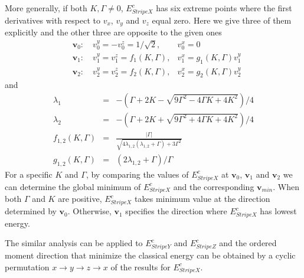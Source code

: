 \documentclass[aps,prb,reprint,amsfonts,amsmath,amssymb,showpacs,groupedaddress,superscriptaddress]{revtex4-1}
\begin{document}
More generally, if both $K, \Gamma \neq 0$, $E_{StripeX}^{c}$ has six extreme points where the first derivatives with respect to $v_x$, $v_y$ and $v_z$ equal zero. Here we give three of them explicitly and the other three are opposite to the given ones
\begin{subequations}
    \begin{eqnarray}
        & \bm{v}_0: \quad v_{0}^{y}=-v_{0}^{z} = 1/\sqrt{2}, & v_{0}^{x} = 0 \\
        & \bm{v}_1: \quad v_{1}^{y}=v_{1}^{z} = f_{1}(K, \Gamma), & v_{1}^{x} = g_{1}(K, \Gamma) v_{1}^{y} \\
        & \bm{v}_2: \quad v_{2}^{y}=v_{2}^{z} = f_{2}(K, \Gamma), & v_{2}^{x} = g_{2}(K, \Gamma) v_{2}^{y}
    \end{eqnarray}
\end{subequations}
and
\begin{subequations}
    \begin{eqnarray}
        \lambda_{1} & = &- (\Gamma +2 K - \sqrt{9\Gamma^2 - 4 \Gamma K + 4 K^2}) / 4 \nonumber \\
        \lambda_{2} & = & -(\Gamma +2 K + \sqrt{9\Gamma^2 + 4 \Gamma K + 4 K^2}) / 4 \nonumber \\
        f_{1,2}(K, \Gamma) & = & \frac{|\Gamma|}{\sqrt{4 \lambda_{1,2} (\lambda_{1,2} + \Gamma) + 3 \Gamma^{2}}} \\
        g_{1,2}(K, \Gamma) & = & (2 \lambda_{1,2} + \Gamma) / \Gamma
    \end{eqnarray}
\end{subequations}
For a specific $K$ and $\Gamma$, by comparing the values of $E_{StripeX}^{c}$ at $\bm{v}_0$, $\bm{v}_1$ and $\bm{v}_2$ we can determine the global minimum of $E_{StripeX}^{c}$ and the corresponding $\bm{v}_{min}$. When both $\Gamma$ and $K$ are positive, $E_{StripeX}^{c}$ takes minimum value at the direction determined by $\bm{v}_0$. Otherwise, $\bm{v}_1$ specifies the direction where $E_{StripeX}^{c}$ has lowest energy.

The similar analysis can be applied to $E_{StripeY}^{c}$ and $E_{StripeZ}^{c}$ and the ordered moment direction that minimize the classical energy can be obtained by a cyclic permutation $x \rightarrow y \rightarrow z \rightarrow x$ of the results for $E_{StripeX}^{c}$.



\newpage


\end{document}
